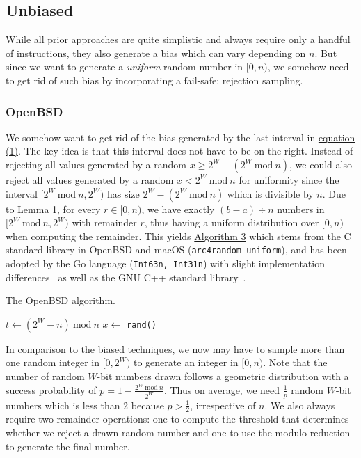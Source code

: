 \documentclass[a4paper, UKenglish, cleveref, autoref, thm-restate]{lipics-v2021}
\newcommand{\Mod}[1]{\ \mathrm{mod}\ #1}
\begin{document}
\subsection{Unbiased}
While all prior approaches are quite simplistic and always require only a handful of instructions, they also generate a bias which can vary depending on $n$.
But since we want to generate a \emph{uniform} random number in $[0,n)$, we somehow need to get rid of such bias by incorporating a fail-safe: rejection sampling.

\subsubsection{OpenBSD}\label{sec:2.2.1}
We somehow want to get rid of the bias generated by the last interval in \hyperref[eq:1]{equation (1)}.
The key idea is that this interval does not have to be on the right.
Instead of rejecting all values generated by a random $x \geq 2^W - (2^W \Mod n)$, we could also reject all values generated by a random $x < 2^W \Mod n$ for uniformity since the interval $[2^W \Mod n, 2^W)$ has size $2^W - (2^W \Mod n)$ which is divisible by $n$.
Due to \hyperref[lemma:1]{Lemma 1}, for every $r \in [0,n)$, we have exactly $(b - a) \div n$ numbers in $[2^W \Mod n,2^W)$ with remainder $r$, thus having a uniform distribution over $[0,n)$ when computing the remainder.
This yields \hyperref[alg:openbsd]{Algorithm 3} which stems from the C standard library in OpenBSD and macOS (\texttt{arc4random\_uniform}), and has been adopted by the Go language (\texttt{Int63n, Int31n}) with slight implementation differences~\cite{GoLang} as well as the GNU C++ standard library~\cite{GnuCpp}.

\begin{algorithm}[!htb] \label{alg:openbsd}
    \caption{The OpenBSD algorithm.}
    \Require{source of uniformly-distributed random integers in $[0,2^W)$ given by \texttt{rand()}}
    $t \leftarrow \left(2^W - n\right) \Mod n$\tcc*[r]{$ \left(2^W - n\right) \Mod n \equiv 2^W \Mod n$}
    $x \leftarrow$ \texttt{rand()}\;
    \KwRet{$x \Mod n$}\;
\end{algorithm}

In comparison to the biased techniques, we now may have to sample more than one random integer in $[0,2^W)$ to generate an integer in $[0,n)$.
Note that the number of random $W$-bit numbers drawn follows a geometric distribution with a success probability of $p = 1 - \frac{2^W \Mod n}{2^W}$.
Thus on average, we need $\frac{1}{p}$ random $W$-bit numbers which is less than $2$ because $p > \frac{1}{2}$, irrespective of $n$.
We also always require two remainder operations: one to compute the threshold that determines whether we reject a drawn random number and one to use the modulo reduction to generate the final number.
\end{document}
